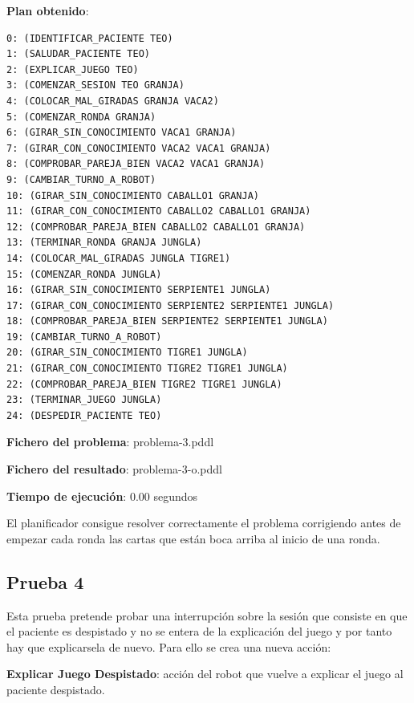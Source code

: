 \documentclass{uc3mpracticas}
\begin{document}
  \begin{multicols}{2}
    \textbf{Plan obtenido}:

    \begin{lstlisting}
0: (IDENTIFICAR_PACIENTE TEO)
1: (SALUDAR_PACIENTE TEO)
2: (EXPLICAR_JUEGO TEO)
3: (COMENZAR_SESION TEO GRANJA)
4: (COLOCAR_MAL_GIRADAS GRANJA VACA2)
5: (COMENZAR_RONDA GRANJA)
6: (GIRAR_SIN_CONOCIMIENTO VACA1 GRANJA)
7: (GIRAR_CON_CONOCIMIENTO VACA2 VACA1 GRANJA)
8: (COMPROBAR_PAREJA_BIEN VACA2 VACA1 GRANJA)
9: (CAMBIAR_TURNO_A_ROBOT)
10: (GIRAR_SIN_CONOCIMIENTO CABALLO1 GRANJA)
11: (GIRAR_CON_CONOCIMIENTO CABALLO2 CABALLO1 GRANJA)
12: (COMPROBAR_PAREJA_BIEN CABALLO2 CABALLO1 GRANJA)
13: (TERMINAR_RONDA GRANJA JUNGLA)
14: (COLOCAR_MAL_GIRADAS JUNGLA TIGRE1)
15: (COMENZAR_RONDA JUNGLA)
16: (GIRAR_SIN_CONOCIMIENTO SERPIENTE1 JUNGLA)
17: (GIRAR_CON_CONOCIMIENTO SERPIENTE2 SERPIENTE1 JUNGLA)
18: (COMPROBAR_PAREJA_BIEN SERPIENTE2 SERPIENTE1 JUNGLA)
19: (CAMBIAR_TURNO_A_ROBOT)
20: (GIRAR_SIN_CONOCIMIENTO TIGRE1 JUNGLA)
21: (GIRAR_CON_CONOCIMIENTO TIGRE2 TIGRE1 JUNGLA)
22: (COMPROBAR_PAREJA_BIEN TIGRE2 TIGRE1 JUNGLA)
23: (TERMINAR_JUEGO JUNGLA)
24: (DESPEDIR_PACIENTE TEO)
    \end{lstlisting}

    \columnbreak

    \textbf{Fichero del problema}: problema-3.pddl

    \textbf{Fichero del resultado}: problema-3-o.pddl

    \textbf{Tiempo de ejecución}: 0.00 segundos
  \end{multicols}

  El planificador consigue resolver correctamente el problema corrigiendo antes de empezar cada ronda las cartas que están boca arriba al inicio de una ronda.


  \subsection{Prueba 4}

  Esta prueba pretende probar una interrupción sobre la sesión que consiste en que el paciente es despistado y no se entera de la explicación del juego y por tanto hay que explicarsela de nuevo. Para ello se crea una nueva acción:

  \vspace{2mm}

  \textbf{Explicar Juego Despistado}: acción del robot que vuelve a explicar el juego al paciente despistado.
\end{document}
